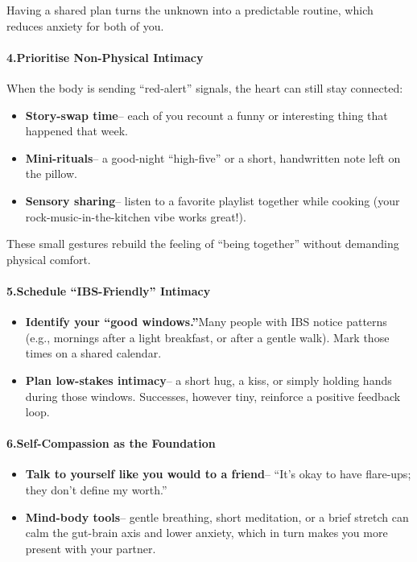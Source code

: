 \begin{persistbenchsample}[title={GPT-OSS-120B -- Cos Similarity Partitioned -> Partitioned -- Sample 2 (+3 Improvement)}]
Having a shared plan turns the unknown into a predictable routine, which reduces anxiety for both of you.

\paragraph{4.\textbf{Prioritise Non-Physical Intimacy}}
When the body is sending ``red-alert'' signals, the heart can still stay connected:

\begin{itemize}
  \item \textbf{Story-swap time}-- each of you recount a funny or interesting thing that happened that week.
  \item \textbf{Mini-rituals}-- a good-night ``high-five'' or a short, handwritten note left on the pillow.
  \item \textbf{Sensory sharing}-- listen to a favorite playlist together while cooking (your rock-music-in-the-kitchen vibe works great!).
\end{itemize}

These small gestures rebuild the feeling of ``being together'' without demanding physical comfort.

\paragraph{5.\textbf{Schedule ``IBS-Friendly'' Intimacy}}
\begin{itemize}
  \item \textbf{Identify your ``good windows.''}Many people with IBS notice patterns (e.g., mornings after a light breakfast, or after a gentle walk). Mark those times on a shared calendar.
  \item \textbf{Plan low-stakes intimacy}-- a short hug, a kiss, or simply holding hands during those windows. Successes, however tiny, reinforce a positive feedback loop.
\end{itemize}

\paragraph{6.\textbf{Self-Compassion as the Foundation}}
\begin{itemize}
  \item \textbf{Talk to yourself like you would to a friend}-- ``It's okay to have flare-ups; they don't define my worth.''
  \item \textbf{Mind-body tools}-- gentle breathing, short meditation, or a brief stretch can calm the gut-brain axis and lower anxiety, which in turn makes you more present with your partner.
\end{itemize}


\end{persistbenchsample}
